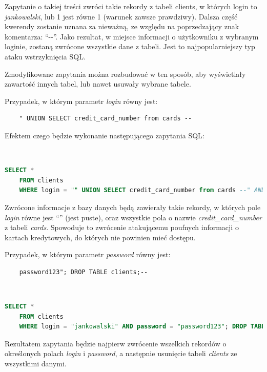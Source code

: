 \documentclass[12pt,twoside]{article}
\begin{document}
Zapytanie o takiej treści zwróci takie rekordy z tabeli clients, w których login to \emph{jankowalski}, lub 1 jest równe 1 (warunek zawsze prawdziwy). Dalsza część kwerendy zostanie uznana za nieważną, ze względu na poprzedzający znak komentarza: ``-\--''. Jako rezultat, w miejsce informacji o użytkowniku z wybranym loginie, zostaną zwrócone wszystkie dane z tabeli. Jest to najpopularniejszy typ ataku wstrzyknięcia SQL. 

Zmodyfikowane zapytania można rozbudować w ten sposób, aby wyświetlały zawartość innych tabel, lub nawet usuwały wybrane tabele.

Przypadek, w którym parametr \emph{login} równy jest:
\begin{verbatim}
	" UNION SELECT credit_card_number from cards --
\end{verbatim}
Efektem czego będzie wykonanie następującego zapytania SQL:

\

\begin{lstlisting}[language=SQL,caption=Zmodyfikowane zapytanie zwracające wrażliwe dane,label={KodSQL5}]
	SELECT * 
	FROM clients
	WHERE login = "" UNION SELECT credit_card_number from cards --" AND password = "password123"
\end{lstlisting}

Zwrócone informacje z bazy danych będą zawierały takie rekordy, w których pole \emph{login} równe jest ``'' (jest puste), oraz wszystkie pola o nazwie \emph{credit\_card\_number} z tabeli \emph{cards}. Spowoduje to zwrócenie atakującemu poufnych informacji o kartach kredytowych, do których nie powinien mieć dostępu.

Przypadek, w którym parametr \emph{password} równy jest:

\begin{verbatim}
	password123"; DROP TABLE clients;--
\end{verbatim}

\

\begin{lstlisting}[language=SQL,caption=Zmodyfikowane zapytanie usuwające tabelę clients,label={KodSQL6}]
	SELECT * 
	FROM clients
	WHERE login = "jankowalski" AND password = "password123"; DROP TABLE clients;--"
\end{lstlisting}	

Rezultatem zapytania będzie najpierw zwrócenie wszelkich rekordów o określonych polach \emph{login} i \emph{password}, a następnie usunięcie tabeli \emph{clients} ze wszystkimi danymi.
\end{document}
